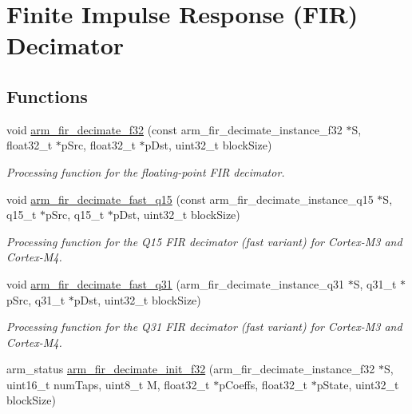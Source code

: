 \hypertarget{group__FIR__decimate}{}\section{Finite Impulse Response (F\+IR) Decimator}
\label{group__FIR__decimate}
\subsection*{Functions}
\begin{DoxyCompactItemize}
\item 
void \hyperlink{group__FIR__decimate_ga25aa3d58a90bf91b6a82272a0bc518f7}{arm\+\_\+fir\+\_\+decimate\+\_\+f32} (const arm\+\_\+fir\+\_\+decimate\+\_\+instance\+\_\+f32 $\ast$S, float32\+\_\+t $\ast$p\+Src, float32\+\_\+t $\ast$p\+Dst, uint32\+\_\+t block\+Size)
\begin{DoxyCompactList}\small\item\em Processing function for the floating-\/point F\+IR decimator. \end{DoxyCompactList}\item 
void \hyperlink{group__FIR__decimate_ga3f434c9a5d3b4e68061feac0714ea2ac}{arm\+\_\+fir\+\_\+decimate\+\_\+fast\+\_\+q15} (const arm\+\_\+fir\+\_\+decimate\+\_\+instance\+\_\+q15 $\ast$S, q15\+\_\+t $\ast$p\+Src, q15\+\_\+t $\ast$p\+Dst, uint32\+\_\+t block\+Size)
\begin{DoxyCompactList}\small\item\em Processing function for the Q15 F\+IR decimator (fast variant) for Cortex-\/\+M3 and Cortex-\/\+M4. \end{DoxyCompactList}\item 
void \hyperlink{group__FIR__decimate_ga3c18cc3d0548a410c577f1bead9582b7}{arm\+\_\+fir\+\_\+decimate\+\_\+fast\+\_\+q31} (arm\+\_\+fir\+\_\+decimate\+\_\+instance\+\_\+q31 $\ast$S, q31\+\_\+t $\ast$p\+Src, q31\+\_\+t $\ast$p\+Dst, uint32\+\_\+t block\+Size)
\begin{DoxyCompactList}\small\item\em Processing function for the Q31 F\+IR decimator (fast variant) for Cortex-\/\+M3 and Cortex-\/\+M4. \end{DoxyCompactList}\item 
arm\+\_\+status \hyperlink{group__FIR__decimate_gaaa2524b08220fd6c3f753e692ffc7d3b}{arm\+\_\+fir\+\_\+decimate\+\_\+init\+\_\+f32} (arm\+\_\+fir\+\_\+decimate\+\_\+instance\+\_\+f32 $\ast$S, uint16\+\_\+t num\+Taps, uint8\+\_\+t M, float32\+\_\+t $\ast$p\+Coeffs, float32\+\_\+t $\ast$p\+State, uint32\+\_\+t block\+Size)

\end{DoxyCompactItemize}

